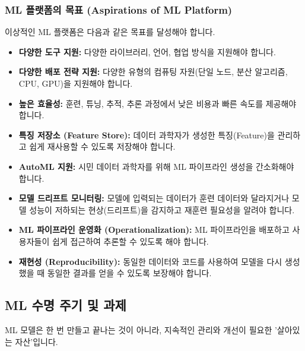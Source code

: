 \documentclass[11pt,a4paper]{article}
\begin{document}
\subsubsection*{ML 플랫폼의 목표 (Aspirations of ML Platform)}
이상적인 ML 플랫폼은 다음과 같은 목표를 달성해야 합니다.
\begin{itemize}
    \item \textbf{다양한 도구 지원:} 다양한 라이브러리, 언어, 협업 방식을 지원해야 합니다.
    \item \textbf{다양한 배포 전략 지원:} 다양한 유형의 컴퓨팅 자원(단일 노드, 분산 알고리즘, CPU, GPU)을 지원해야 합니다.
    \item \textbf{높은 효율성:} 훈련, 튜닝, 추적, 추론 과정에서 낮은 비용과 빠른 속도를 제공해야 합니다.
    \item \textbf{특징 저장소 (Feature Store):} 데이터 과학자가 생성한 특징(Feature)을 관리하고 쉽게 재사용할 수 있도록 저장해야 합니다.
    \item \textbf{AutoML 지원:} 시민 데이터 과학자를 위해 ML 파이프라인 생성을 간소화해야 합니다.
    \item \textbf{모델 드리프트 모니터링:} 모델에 입력되는 데이터가 훈련 데이터와 달라지거나 모델 성능이 저하되는 현상(드리프트)을 감지하고 재훈련 필요성을 알려야 합니다.
    \item \textbf{ML 파이프라인 운영화 (Operationalization):} ML 파이프라인을 배포하고 사용자들이 쉽게 접근하여 추론할 수 있도록 해야 합니다.
    \item \textbf{재현성 (Reproducibility):} 동일한 데이터와 코드를 사용하여 모델을 다시 생성했을 때 동일한 결과를 얻을 수 있도록 보장해야 합니다.
\end{itemize}

\subsection*{ML 수명 주기 및 과제}
ML 모델은 한 번 만들고 끝나는 것이 아니라, 지속적인 관리와 개선이 필요한 '살아있는 자산'입니다.
\end{document}
